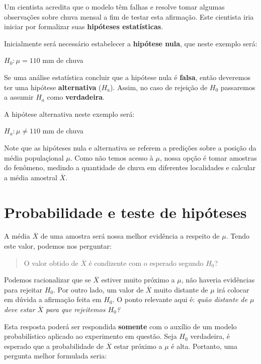 \documentclass[
]{book}
\begin{document}
Um cientista acredita que o modelo têm falhas e resolve tomar algumas observações sobre chuva mensal a fim de testar esta afirmação. Este cientista iria iniciar por formalizar suas \textbf{hipóteses estatísticas}.

Inicialmente será necessário estabelecer a \textbf{hipótese nula}, que neste exemplo será:

\(H_0: \mu = 110\) mm de chuva

Se uma análise estatística concluir que a hipótese nula é \textbf{falsa}, então deveremos ter uma hipótese \textbf{alternativa} (\(H_a\)). Assim, no caso de rejeição de \(H_0\) passaremos a assumir \(H_a\) como \textbf{verdadeira}.

A hipótese alternativa neste exemplo será:

\(H_a: \mu \ne 110\) mm de chuva

Note que as hipóteses nula e alternativa se referem a predições sobre a posição da média populaçional \(\mu\). Como não temos acesso à \(\mu\), nossa opção é tomar amostras do fenômeno, medindo a quantidade de chuva em diferentes localidades e calcular a média amostral \(\overline{X}\).

\hypertarget{probabilidade-e-teste-de-hipuxf3teses}{%
\section{Probabilidade e teste de hipóteses}\label{probabilidade-e-teste-de-hipuxf3teses}}

A média \(\overline{X}\) de uma amostra será nossa melhor evidência a respeito de \(\mu\). Tendo este valor, podemos nos perguntar:

\begin{quote}
O valor obtido de \(\overline{X}\) é condizente com o esperado segundo \(H_0\)?
\end{quote}

Podemos racionalizar que se \(\overline{X}\) estiver muito próximo a \(\mu\), não haveria evidências para rejeitar \(H_0\). Por outro lado, um valor de \(\overline{X}\) muito distante de \(\mu\) irá colocar em dúvida a afirmação feita em \(H_0\). O ponto relevante aqui é: \emph{quão distante de \(\mu\) deve estar \(\overline{X}\) para que rejeitemos \(H_0\)?}

Esta resposta poderá ser respondida \textbf{somente} com o auxílio de um modelo probabilístico aplicado ao experimento em questão. Seja \(H_0\) verdadeira, é esperado que a probabilidade de \(\overline{X}\) estar próximo a \(\mu\) é alta. Portanto, uma pergunta melhor formulada seria:
\end{document}
